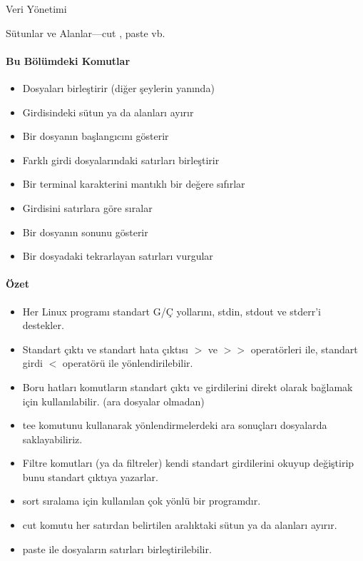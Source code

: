 \begin{section}{Veri Yönetimi}
\begin{subsection}{Sütunlar ve Alanlar—cut , paste vb.}
\paragraph{Bu Bölümdeki Komutlar}{
\begin{itemize}
\item[cat]Dosyaları birleştirir (diğer şeylerin yanında)
\item[cut]Girdisindeki sütun ya da alanları ayırır
\item[head]Bir dosyanın başlangıcını gösterir
\item[paste]Farklı girdi dosyalarındaki satırları birleştirir
\item[reset]Bir terminal karakterini mantıklı bir değere sıfırlar
\item[sort]Girdisini satırlara göre sıralar
\item[tail]Bir dosyanın sonunu gösterir
\item[uniq]Bir dosyadaki tekrarlayan satırları vurgular
\end{itemize}}

\paragraph{Özet}{
\begin{itemize}
\item Her Linux programı standart G/Ç yollarını, stdin, stdout ve stderr'i destekler. 
\item Standart çıktı ve standart hata çıktısı $>$ ve $>>$ operatörleri ile, standart girdi $<$ operatörü ile yönlendirilebilir.
\item Boru hatları komutların standart çıktı ve girdilerini direkt olarak bağlamak için kullanılabilir. (ara dosyalar olmadan)
\item tee komutunu kullanarak yönlendirmelerdeki ara sonuçları dosyalarda saklayabiliriz. 
\item Filtre komutları (ya da filtreler) kendi standart girdilerini okuyup değiştirip bunu standart çıktıya yazarlar. 
\item sort sıralama için kullanılan çok yönlü bir programdır. 
\item cut komutu her satırdan belirtilen aralıktaki sütun ya da alanları ayırır.
\item paste ile dosyaların satırları birleştirilebilir. 
\end{itemize}}
\end{subsection}
\end{section}